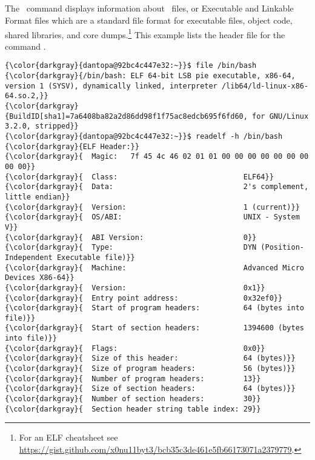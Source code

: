 % 

\subsection{\readelf}
\label{sec:readelf}
The  \ command displays information about \elf \ files, or Executable and Linkable Format files which are a standard file format for executable files, object code, shared libraries, and core dumps.\footnote{For an ELF cheatsheet see \href{https://gist.github.com/x0nu11byt3/bcb35c3de461e5fb66173071a2379779}{https://gist.github.com/x0nu11byt3/bcb35c3de461e5fb66173071a2379779}.} This example lists the header file for the command .
{\footnotesize{
\begin{Verbatim}[commandchars=\\\{\}]
{\color{darkgray}{dantopa@92bc4c447e32:~}}$ file /bin/bash
{\color{darkgray}{/bin/bash: ELF 64-bit LSB pie executable, x86-64, version 1 (SYSV), dynamically linked, interpreter /lib64/ld-linux-x86-64.so.2,}} 
{\color{darkgray}{BuildID[sha1]=7a6408ba82a2d86dd98f1f75ac8edcb695f6fd60, for GNU/Linux 3.2.0, stripped}}
{\color{darkgray}{dantopa@92bc4c447e32:~}}$ readelf -h /bin/bash
{\color{darkgray}{ELF Header:}}
{\color{darkgray}{  Magic:   7f 45 4c 46 02 01 01 00 00 00 00 00 00 00 00 00}} 
{\color{darkgray}{  Class:                             ELF64}}
{\color{darkgray}{  Data:                              2's complement, little endian}}
{\color{darkgray}{  Version:                           1 (current)}}
{\color{darkgray}{  OS/ABI:                            UNIX - System V}}
{\color{darkgray}{  ABI Version:                       0}}
{\color{darkgray}{  Type:                              DYN (Position-Independent Executable file)}}
{\color{darkgray}{  Machine:                           Advanced Micro Devices X86-64}}
{\color{darkgray}{  Version:                           0x1}}
{\color{darkgray}{  Entry point address:               0x32ef0}}
{\color{darkgray}{  Start of program headers:          64 (bytes into file)}}
{\color{darkgray}{  Start of section headers:          1394600 (bytes into file)}}
{\color{darkgray}{  Flags:                             0x0}}
{\color{darkgray}{  Size of this header:               64 (bytes)}}
{\color{darkgray}{  Size of program headers:           56 (bytes)}}
{\color{darkgray}{  Number of program headers:         13}}
{\color{darkgray}{  Size of section headers:           64 (bytes)}}
{\color{darkgray}{  Number of section headers:         30}}
{\color{darkgray}{  Section header string table index: 29}}
\end{Verbatim}
}}

\endinput  %
